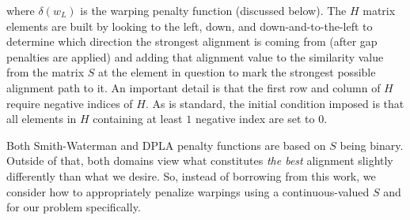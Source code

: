 \documentclass[12pt]{report} 	%
\numberwithin{figure}{chapter}
\numberwithin{table}{chapter}
\numberwithin{equation}{chapter}
\begin{document}
\begin{flushleft}
\vspace{10 mm}
\noindent  where $\delta(w_L)$ is the warping penalty function (discussed below). The $H$ matrix elements are built by looking to the left, down, and down-and-to-the-left to determine which direction the strongest alignment is coming from (after gap penalties are applied) and adding that alignment value to the similarity value from the matrix $S$ at the element in question to mark the strongest possible alignment path to it. An important detail is that the first row and column of $H$ require negative indices of $H$. As is standard, the initial condition imposed is that all elements in $H$ containing at least $1$ negative index are set to $0$.

Both Smith-Waterman and DPLA penalty functions are based on $S$ being binary. Outside of that, both domains view what constitutes \textit{the best} alignment slightly differently than what we desire. So, instead of borrowing from this work, we consider how to appropriately penalize warpings using a continuous-valued $S$ and for our problem specifically.


\end{flushleft}
\end{document}
